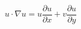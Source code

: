 \documentclass[preview,border=2pt]{standalone}
\begin{document}
\[
u\cdot\nabla u = u\frac{\partial u}{\partial x}+v\frac{\partial u}{\partial y}
\]
\end{document}
